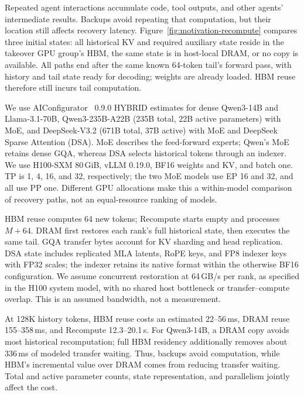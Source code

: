 

Repeated agent interactions accumulate code, tool outputs, and other
agents' intermediate results. Backups avoid repeating that computation,
but their location still affects recovery latency.
Figure~\ref{fig:motivation-recompute} compares three initial states:
all historical KV and required auxiliary state reside in the takeover
GPU group's HBM, the same state is in host-local DRAM, or no copy is
available. All paths end after the same known 64-token tail's forward
pass, with history and tail state ready for decoding; weights are
already loaded. HBM reuse therefore still incurs tail computation.

We use AIConfigurator~\cite{nvidia2026aiconfigurator} 0.9.0 HYBRID estimates
for dense Qwen3-14B and Llama-3.1-70B, Qwen3-235B-A22B (235B total,
22B active parameters) with MoE, and DeepSeek-V3.2 (671B total, 37B
active) with MoE and DeepSeek Sparse Attention (DSA). MoE describes the
feed-forward experts; Qwen's MoE retains dense GQA, whereas DSA selects
historical tokens through an indexer. We use H100-SXM 80\,GiB, vLLM
0.19.0, BF16 weights and KV, and batch one. TP is 1, 4, 16, and 32,
respectively; the two MoE models use EP 16 and 32, and all use PP one.
Different GPU allocations make this a within-model comparison of
recovery paths, not an equal-resource ranking of models.

HBM reuse computes 64 new tokens; Recompute starts empty and processes
$M+64$. DRAM first restores each rank's full historical state, then
executes the same tail. GQA transfer bytes account for KV sharding and
head replication. DSA state includes replicated MLA latents, RoPE keys,
and FP8 indexer keys with FP32 scales; the indexer retains its native
format within the otherwise BF16 configuration. We assume concurrent
restoration at 64\,GB/s per rank, as specified in the H100 system model,
with no shared host bottleneck or transfer--compute overlap. This is an
assumed bandwidth, not a measurement.

At 128K history tokens, HBM reuse costs an estimated 22--56\,ms,
DRAM reuse 155--358\,ms, and Recompute 12.3--20.1\,s. For Qwen3-14B,
a DRAM copy avoids most historical recomputation; full HBM residency
additionally removes about 336\,ms of modeled transfer waiting.
Thus, backups avoid computation, while HBM's incremental value over
DRAM comes from reducing transfer waiting. Total and active parameter
counts, state representation, and parallelism jointly affect the cost.

